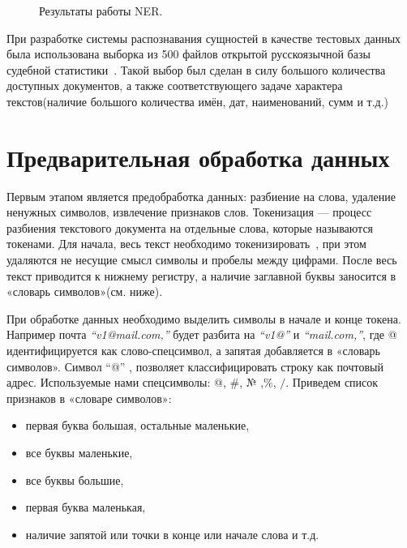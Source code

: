 \documentclass{csmathnotes}
\begin{document}
\begin{figure}[h]
	\caption{Результаты работы NER.}
	\label{fig:ner}
\end{figure}


При разработке системы распознавания сущностей в качестве тестовых данных была использована выборка из 500 файлов открытой русскоязычной базы судебной статистики~\cite{CourtsData}. Такой выбор был сделан в силу большого количества доступных документов, а также соответствующего задаче характера текстов(наличие большого количества имён, дат, наименований, сумм и т.д.)

\section*{Предварительная обработка данных}
Первым этапом является предобработка данных: разбиение на слова, удаление ненужных символов, извлечение признаков слов. 
Токенизация — процесс разбиения текстового документа на отдельные слова, которые называются токенами. Для начала, весь текст необходимо токенизировать~\cite{Ner}, при этом удаляются не несущие смысл символы и пробелы между цифрами. После весь текст приводится к нижнему регистру, а наличие заглавной буквы заносится в «словарь символов»(см. ниже).


При обработке данных необходимо выделить символы в начале и конце токена.  Например почта \emph{“v1@mail.com,”} будет разбита на \emph{“v1@”} и \emph{“mail.com,”}, где @ идентифицируется как слово-спецсимвол, а запятая добавляется в «словарь символов». Символ “@” , позволяет классифицировать строку как почтовый адрес. Используемые нами спецсимволы: @, \#, № ,\%, $/$.
Приведем список признаков в «словаре символов»:
\begin{itemize}
    \item первая буква большая, остальные маленькие,
    \item все буквы маленькие,
    \item все буквы большие,
    \item первая буква маленькая,
    \item наличие запятой или точки в конце или начале слова и т.д.
\end{itemize}
\end{document}

